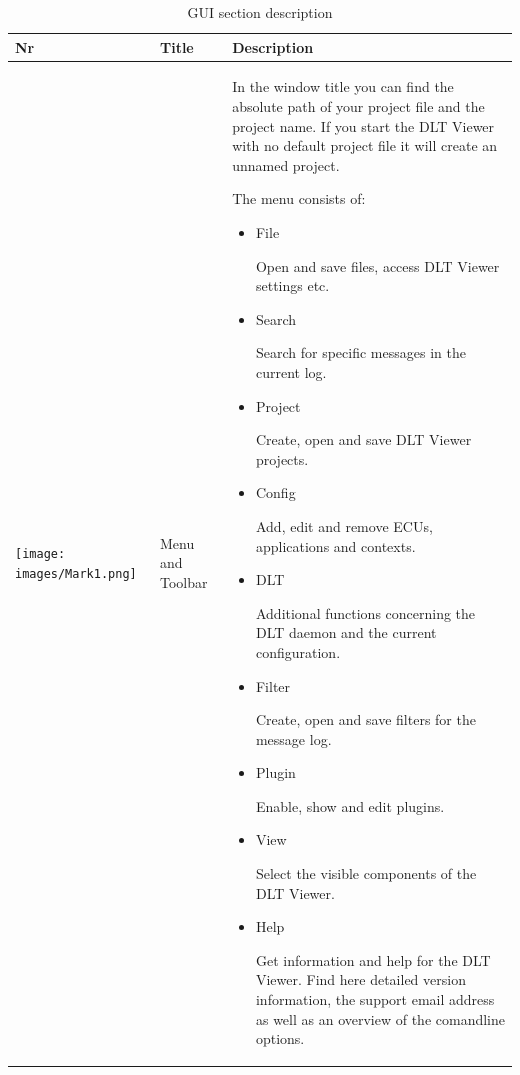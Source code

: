 \documentclass[a4paper,11pt]{article}
\begin{document}
\begin{longtable}{| l | m{3cm}  | m{11cm} |}
\caption[GUI section description]{GUI section description} \label{guisectiondescription} \\
 \hline
   \textbf{Nr} & \textbf{Title} & \textbf{Description} \\
\hline
   \texttt{[image: images/Mark1.png]}
   &
    Menu and Toolbar
   &
   In the window title you can find the absolute path of your project file 
   and the project name. If you start the DLT Viewer
   with no default project file it will
   create an unnamed project.

   The menu consists of:

\begin{itemize}
    \item \begin{bf}File\end{bf}
     Open and save files, access DLT Viewer settings etc.
    \item \begin{bf}Search\end{bf}
     Search for specific messages in the current log.
    \item \begin{bf}Project\end{bf}
      Create, open and save DLT Viewer projects.
    \item \begin{bf}Config\end{bf}
     Add, edit and remove ECUs, applications and contexts.
    \item \begin{bf}DLT\end{bf}
      Additional functions concerning the DLT daemon and the current configuration.
    \item \begin{bf}Filter\end{bf}
       Create, open and save filters for the message log.
    \item \begin{bf}Plugin\end{bf}
     Enable, show and edit plugins.
    \item \begin{bf}View\end{bf}
     Select the visible components of the DLT Viewer.
    \item \begin{bf}Help\end{bf}
    Get information and help for the DLT Viewer. Find here detailed version information, the support email address as well as
    an overview of the comandline options.
 \end{itemize}


\end{longtable}
\end{document}
